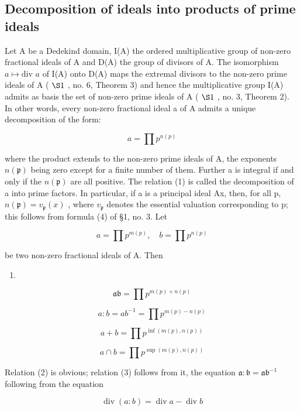 \subsection{Decomposition of ideals into products of prime ideals}

Let A be a Dedekind domain, I(A) the ordered multiplicative group of non-zero fractional ideals of A and D(A) the group of divisors of A. The isomorphism \(a \mapsto \text{div } a\) of I(A) onto D(A) maps the extremal divisors to the non-zero prime ideals of A ( \(\S 1\) , no. 6, Theorem 3) and hence the multiplicative group I(A) admits as basis the set of non-zero prime ideals of A ( \(\S 1\) , no. 3, Theorem 2). In other words, every non-zero fractional ideal a of A admits a unique decomposition of the form:

\[
a = \prod p ^ {n (p)}\tag{1}
\]

where the product extends to the non-zero prime ideals of A, the exponents \(n(\mathfrak{p})\) being zero except for a finite number of them. Further a is integral if and only if the \(n(\mathfrak{p})\) are all positive. The relation (1) is called the decomposition of a into prime factors. In particular, if a is a principal ideal Ax, then, for all p, \(n(\mathfrak{p}) = v_{\mathfrak{p}}(x)\) , where \(v_{\mathfrak{p}}\) denotes the essential valuation corresponding to p; this follows from formula (4) of §1, no. 3. Let

\[
a = \prod p ^ {m (p)}, \quad b = \prod p ^ {n (p)}
\]

be two non-zero fractional ideals of A. Then

\begin{enumerate}
\def\labelenumi{(\arabic{enumi})}
\setcounter{enumi}{1}
\tightlist
\item
\end{enumerate}

\[
\mathfrak {a b} = \prod p ^ {m (p) + n (p)}\tag{3}
\]

\[
a: b = a b ^ {- 1} = \prod p ^ {m (p) - n (p)}\tag{4}
\]

\[
a + b = \prod p ^ {\inf (m (p), n (p))}\tag{5}
\]

\[
a \cap b = \prod p ^ {\sup (m (p), n (p))}
\]

Relation (2) is obvious; relation (3) follows from it, the equation \(\mathfrak{a} \colon \mathfrak{b} = \mathfrak{ab}^{-1}\) following from the equation

\[
\operatorname{div} (a: b) = \operatorname{div} a - \operatorname{div} b
\]

